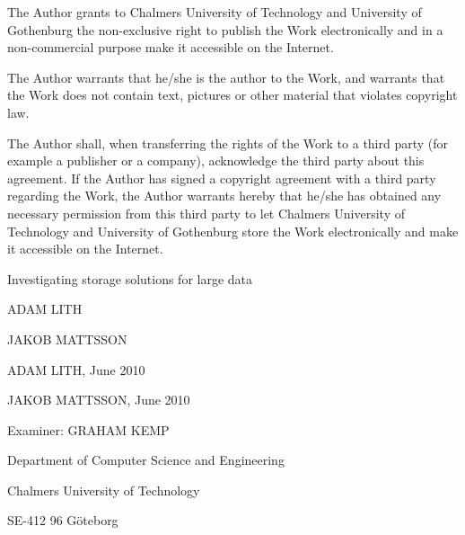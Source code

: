 \newpage
\renewcommand\thepage{\arabic{page}}
\changepage{-60mm}{}{}{39mm}{}{47mm}{}{}{}

\pagebreak

\setcounter{page}{1}

\noindent The Author grants to Chalmers University of Technology and University of Gothenburg the non-exclusive right to publish the Work electronically and in a non-commercial purpose make it accessible on the Internet.

\vspace{12pt}

\noindent The Author warrants that he/she is the author to the Work, and warrants that the Work does not contain text, pictures or other material that violates copyright law.

\vspace{12pt}

\noindent The Author shall, when transferring the rights of the Work to a third party (for example a publisher or a company), acknowledge the third party about this agreement. If the Author has signed a copyright agreement with a third party regarding the Work, the Author warrants hereby that he/she has obtained any necessary permission from this third party to let Chalmers University of Technology and University of Gothenburg store the Work electronically and make it accessible on the Internet.

\vspace{64pt}

\noindent Investigating storage solutions for large data

\vspace{24pt}

\noindent ADAM LITH

\noindent JAKOB MATTSSON

\vspace{12pt}

\noindent {\copyright} ADAM LITH, June 2010

\noindent {\copyright} JAKOB MATTSSON, June 2010

\vspace{12pt}

\noindent Examiner: GRAHAM KEMP

\vspace{72pt}

\noindent Department of Computer Science and Engineering

\noindent Chalmers University of Technology

\noindent SE-412 96 G{\"o}teborg

